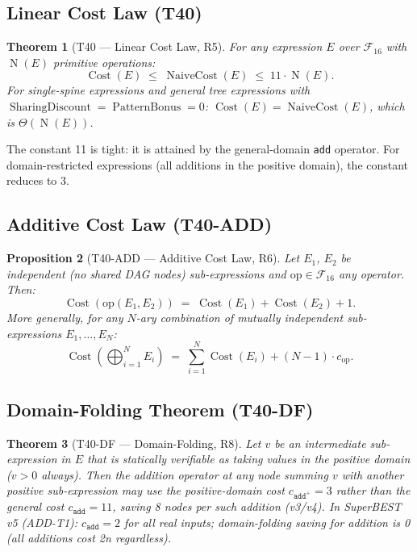 \documentclass[12pt,a4paper]{article}
\newtheorem{theorem}{Theorem}[section]
\newtheorem{proposition}[theorem]{Proposition}
\theoremstyle{definition}
\newcommand{\Cost}{\operatorname{Cost}}
\newcommand{\NC}{\operatorname{NaiveCost}}
\newcommand{\SD}{\operatorname{SharingDiscount}}
\newcommand{\PB}{\operatorname{PatternBonus}}
\newcommand{\NOp}{\operatorname{N}}
\begin{document}
\subsection{Linear Cost Law (T40)}

\begin{theorem}[T40 --- Linear Cost Law, R5]
\label{thm:T40}
For any expression $E$ over $\mathcal{F}_{16}$ with $\NOp(E)$ primitive
operations:
\[
  \Cost(E) \;\leq\; \NC(E) \;\leq\; 11 \cdot \NOp(E).
\]
For single-spine expressions and general tree expressions with $\SD=\PB=0$:
$\Cost(E) = \NC(E)$, which is $\Theta(\NOp(E))$.
\end{theorem}

The constant 11 is tight: it is attained by the general-domain
\texttt{add} operator.  For domain-restricted expressions (all additions
in the positive domain), the constant reduces to 3.

\subsection{Additive Cost Law (T40-ADD)}

\begin{proposition}[T40-ADD --- Additive Cost Law, R6]
\label{prop:ADD}
Let $E_1$, $E_2$ be \emph{independent} (no shared DAG nodes) sub-expressions
and $\mathrm{op} \in \mathcal{F}_{16}$ any operator.  Then:
\[
  \Cost(\mathrm{op}(E_1, E_2)) \;=\; \Cost(E_1) + \Cost(E_2) + 1.
\]
More generally, for any $N$-ary combination of mutually independent
sub-expressions $E_1,\ldots,E_N$:
\[
  \Cost\!\left(\bigoplus_{i=1}^{N} E_i\right)
  \;=\; \sum_{i=1}^{N} \Cost(E_i) + (N-1)\cdot c_{\mathrm{op}}.
\]
\end{proposition}

\subsection{Domain-Folding Theorem (T40-DF)}

\begin{theorem}[T40-DF --- Domain-Folding, R8]
\label{thm:DF}
Let $v$ be an intermediate sub-expression in $E$ that is statically
verifiable as taking values in the positive domain ($v > 0$ always).
Then the addition operator at any node summing $v$ with another positive
sub-expression may use the positive-domain cost $c_{\texttt{add}^+}=3$
rather than the general cost $c_{\texttt{add}}=11$, saving 8 nodes per
such addition (v3/v4).
\emph{In SuperBEST v5 (ADD-T1): $c_{\texttt{add}}=2$ for all real inputs;
domain-folding saving for addition is 0 (all additions cost 2n regardless).}
\end{theorem}
\end{document}
